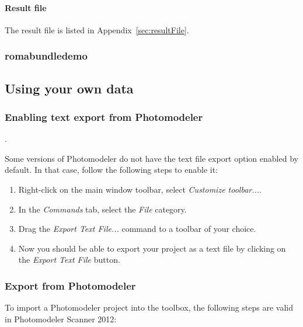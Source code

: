 \documentclass{article}
\begin{document}
\paragraph{Result file}

The result file is listed in Appendix~\ref{sec:resultFile}.

\subsubsection{romabundledemo}

\newpage
\subsection{Using your own data}

\subsubsection{Enabling text export from Photomodeler}
\label{sec:enableTextExport}.

Some versions of Photomodeler do not have the text file export option
enabled by default. In that case, follow the following steps to enable
it:
\begin{enumerate}
\item Right-click on the main window toolbar, select \emph{Customize toolbar...}.
\item In the \emph{Commands} tab, select the \emph{File} category.
\item Drag the \emph{Export Text File...} command to a toolbar of
  your choice.
\item Now you should be able to export your project as a text file by
  clicking on the \emph{Export Text File} button.
\end{enumerate}

\subsubsection{Export from Photomodeler}

To import a Photomodeler project into the toolbox, the following
steps are valid in Photomodeler Scanner 2012:
\end{document}
